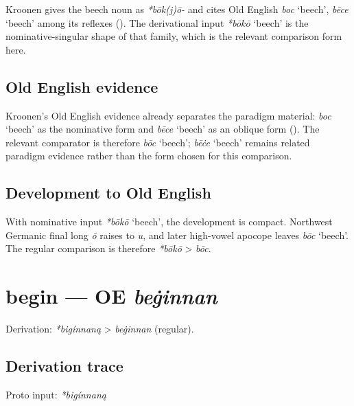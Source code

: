 \documentclass[
  british,
  a4paper,
  openany]{book}
\providecommand{\Recon}[1]{\emph{*#1}}
{\catcode`→=\active \global\def→{\ensuremath{\rightarrow}}}
\providecommand{\texorpdfstring}[2]{#1}
\providecommand{\Recon}[1]{\emph{*#1}}
{\catcode`→=\active \global\def→{\ensuremath{\rightarrow}}}
\begin{document}
Kroonen gives the beech noun as \emph{*bōk(j)ō-} and cites Old English
\emph{boc} `beech', {\emph{bēce}} `beech' among its reflexes
(). The derivational input
\Recon{bōkō} `beech' is the nominative-singular shape of that family,
which is the relevant comparison form here.

\subsection{Old English evidence}\label{old-english-evidence-2}

Kroonen's Old English evidence already separates the paradigm material:
\emph{boc} `beech' as the nominative form and {\emph{bēce}} `beech' as
an oblique form (). The relevant
comparator is therefore \emph{bōc} `beech'; {\emph{bēċe}} `beech'
remains related paradigm evidence rather than the form chosen for this
comparison.

\subsection{Development to Old
English}\label{development-to-old-english-2}

With nominative input \Recon{bōkō} `beech', the development is compact.
Northwest Germanic final long \emph{ō} raises to \emph{u}, and later
high-vowel apocope leaves \emph{bōc} `beech'. The regular comparison is
therefore \emph{*bōkō} \textgreater{} \emph{bōc}.

\section{\texorpdfstring{begin --- OE
\emph{beġinnan}}{begin --- OE beġinnan}}\label{begin-oe-beux121innan}


Derivation: \emph{*bigínnaną} \textgreater{} \emph{beġinnan} (regular).

\subsection{Derivation trace}\label{derivation-trace-3}

Proto input: \emph{*bigínnaną}

\begingroup
\setlength{\fboxsep}{6pt}
\end{document}
